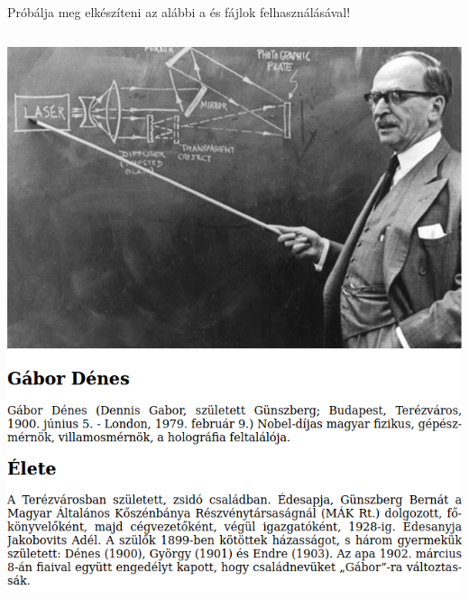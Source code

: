 \begin{frame}
  Próbálja meg elkészíteni az alábbi  a  és  fájlok felhasználásával!
  \vfill
  \begin{columns}[T]
      \includegraphics[width=\textwidth]{gabor1.png}

\end{columns}
\end{frame}
